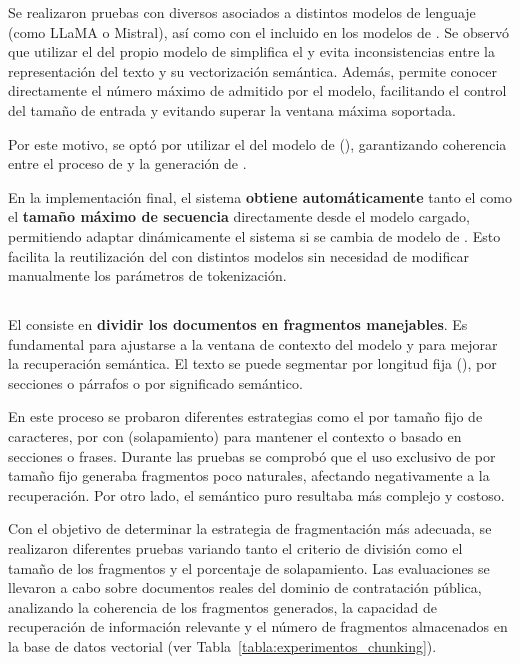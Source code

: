 Se realizaron pruebas con diversos  asociados a distintos modelos de lenguaje (como LLaMA o Mistral), así como con el  incluido en los modelos de . Se observó que utilizar el  del propio modelo de  simplifica el  y evita inconsistencias entre la representación del texto y su vectorización semántica. Además, permite conocer directamente el número máximo de  admitido por el modelo, facilitando el control del tamaño de entrada y evitando superar la ventana máxima soportada.

Por este motivo, se optó por utilizar el  del modelo de  (), garantizando coherencia entre el proceso de  y la generación de .

En la implementación final, el sistema  \textbf{obtiene automáticamente} tanto el  \textbf{} como el  \textbf{tamaño máximo de secuencia} directamente desde el modelo cargado, permitiendo adaptar dinámicamente el sistema si se cambia de modelo de . Esto facilita la reutilización del  con distintos modelos sin necesidad de modificar manualmente los parámetros de tokenización.

\subsection{}

El  consiste en \textbf{dividir los documentos en fragmentos manejables}. Es fundamental para ajustarse a la ventana de contexto del modelo y para mejorar la recuperación semántica. El texto se puede segmentar por longitud fija (), por secciones o párrafos o por significado semántico.

En este proceso se probaron diferentes estrategias como el  por tamaño fijo de caracteres, por  con  (solapamiento) para mantener el contexto o basado en secciones o frases. Durante las pruebas se  comprobó que el uso exclusivo de  por tamaño fijo generaba fragmentos poco naturales, afectando negativamente a la recuperación. Por otro lado, el  semántico puro resultaba más complejo y costoso.

Con el objetivo de determinar la estrategia de fragmentación más adecuada, se realizaron diferentes pruebas variando tanto el criterio de división como el tamaño de los fragmentos y el porcentaje de solapamiento. Las evaluaciones se llevaron a cabo sobre documentos reales del dominio de contratación pública, analizando la coherencia de los fragmentos generados, la capacidad de recuperación de información relevante y el número de fragmentos almacenados en la base de datos vectorial (ver Tabla~\ref{tabla:experimentos_chunking}).

